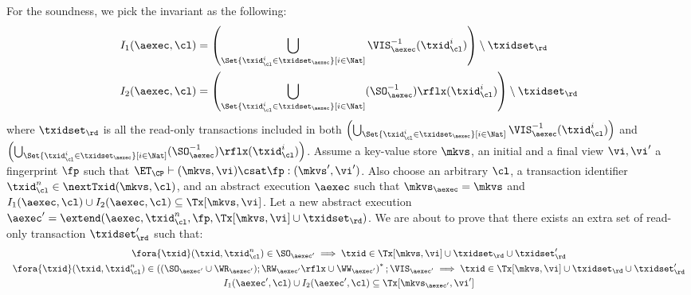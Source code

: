 For the soundness, we pick the invariant as the following:
\begin{align*}
    I_1(\aexec, \cl) & = \left( \bigcup_{\Set{\txid_{\cl}^{i} \in \txidset_{\aexec} }[ i \in \Nat ]} \VIS_{\aexec}^{-1}(\txid^i_\cl) \right) \setminus \txidset_\rd \\
    I_2(\aexec, \cl) & = \left( \bigcup_{\Set{\txid_{\cl}^{i} \in \txidset_{\aexec} }[ i \in \Nat ]} (\SO_{\aexec}^{-1})\rflx(\txid^i_\cl) \right) \setminus \txidset_\rd
\end{align*}
where \( \txidset_\rd \) is all the read-only transactions included in both 
\( \left( \bigcup_{\Set{\txid_{\cl}^{i} \in \txidset_{\aexec} }[ i \in \Nat ]} \VIS_{\aexec}^{-1}(\txid^i_\cl) \right)\) 
and \( \left( \bigcup_{\Set{\txid_{\cl}^{i} \in \txidset_{\aexec} }[ i \in \Nat ]} (\SO_{\aexec}^{-1})\rflx(\txid^i_\cl) \right) \).
Assume a key-value store $\mkvs$, an initial and a final view $\vi, \vi'$  a fingerprint $\fp$ 
such that $\ET_{\CP} \vdash (\mkvs, \vi) \csat \fp: ( \mkvs',\vi')$. 
Also choose an arbitrary $\cl$, a transaction identifier $\txid_\cl^n \in \nextTxid(\mkvs, \cl)$, 
and an abstract execution $\aexec$ such that $\mkvs_{\aexec} = \mkvs$ and 
\( I_1(\aexec, \cl) \cup I_2(\aexec, \cl) \subseteq \Tx[\mkvs, \vi] \).
Let a new abstract execution \( \aexec' = \extend(\aexec, \txid_\cl^n, \fp, \Tx[\mkvs, \vi] \cup \txidset_\rd) \).
We are about to prove that there exists an extra set of read-only transaction \( \txidset'_\rd \) such that:
\begin{gather}
    \fora{\txid} (\txid, \txid_\cl^n) \in \SO_{\aexec'} \implies \txid \in \Tx[\mkvs, \vi] \cup \txidset_\rd \cup \txidset'_\rd \label{equ:cp-sound-update-so}\\
    \begin{array}{l}
    \fora{\txid} (\txid, \txid_\cl^n) \in \left( (\SO_{\aexec'} \cup \WR_{\aexec'} ) ; \RW_{\aexec'}\rflx \cup \WW_{\aexec'} \right)^* ; \VIS_{\aexec'} 
    \implies \txid \in \Tx[\mkvs, \vi] \cup \txidset_\rd \cup \txidset'_\rd 
    \end{array}
    \label{equ:cp-sound-update-arvis}\\
    I_1(\aexec',\cl) \cup I_2(\aexec',\cl) \subseteq \Tx[\mkvs_{\aexec'}, \vi'] \label{equ:cp-sound-inv} 
\end{gather}
